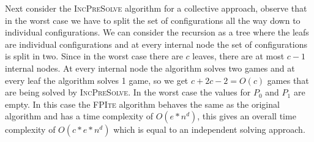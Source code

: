 Next consider the \textsc{IncPreSolve} algorithm for a collective approach, observe that in the worst case we have to split the set of configurations all the way down to individual configurations. We can consider the recursion as a tree where the leafs are individual configurations and at every internal node the set of configurations is split in two. Since in the worst case there are $c$ leaves, there are at most $c-1$ internal nodes. At every internal node the algorithm solves two games and at every leaf the algorithm solves 1 game, so we get $c + 2c - 2 = O(c)$ games that are being solved by \textsc{IncPreSolve}. In the worst case the values for $P_0$ and $P_1$ are empty. In this case the \textsc{FPIte} algorithm behaves the same as the original algorithm and has a time complexity of $O(e*n^d)$, this gives an overall time complexity of $O(c*e*n^d)$ which is equal to an independent solving approach.